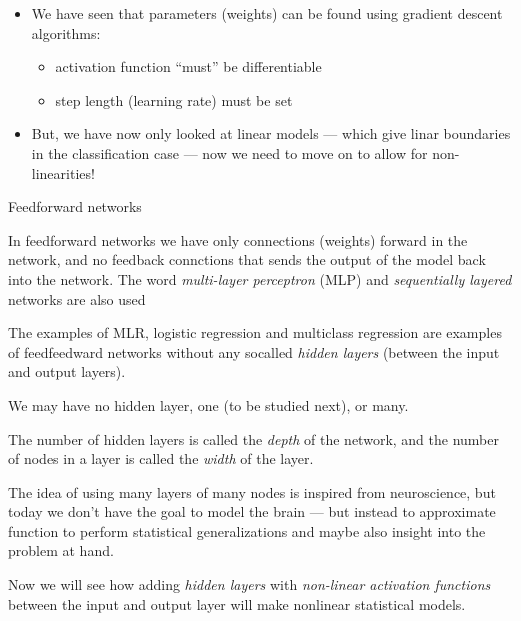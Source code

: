 \documentclass[10pt,ignorenonframetext,]{beamer}
\providecommand{\tightlist}{%
  \setlength{\itemsep}{0pt}\setlength{\parskip}{0pt}}
\begin{document}
\begin{frame}

\begin{itemize}
\tightlist
\item
  We have seen that parameters (weights) can be found using gradient
  descent algorithms:

  \begin{itemize}
  \tightlist
  \item
    activation function ``must'' be differentiable
  \item
    step length (learning rate) must be set
  \end{itemize}
\item
  But, we have now only looked at linear models --- which give linar
  boundaries in the classification case --- now we need to move on to
  allow for non-linearities!
\end{itemize}

\end{frame}

\begin{frame}{Feedforward networks}

In feedforward networks we have only connections (weights) forward in
the network, and no feedback connctions that sends the output of the
model back into the network. The word \emph{multi-layer perceptron}
(MLP) and \emph{sequentially layered} networks are also used

The examples of MLR, logistic regression and multiclass regression are
examples of feedfeedward networks without any socalled \emph{hidden
layers} (between the input and output layers).

We may have no hidden layer, one (to be studied next), or many.

The number of hidden layers is called the \emph{depth} of the network,
and the number of nodes in a layer is called the \emph{width} of the
layer.

\end{frame}

\begin{frame}

The idea of using many layers of many nodes is inspired from
neuroscience, but today we don't have the goal to model the brain ---
but instead to approximate function to perform statistical
generalizations and maybe also insight into the problem at hand.

Now we will see how adding \emph{hidden layers} with \emph{non-linear
activation functions} between the input and output layer will make
nonlinear statistical models.

\end{frame}
\end{document}
